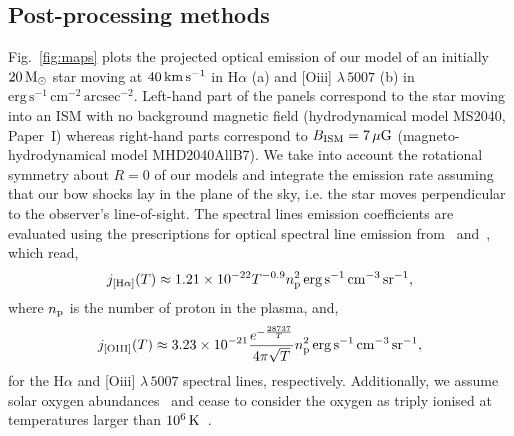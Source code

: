 \documentclass[useAMS,usenatbib]{mn2e}
\begin{document}
\subsection{Post-processing methods}
\label{sect:maps}


Fig.~\ref{fig:maps} plots the projected optical emission of our model of an initially
$20\, \rm M_{\odot}$ star moving at $40\, \rm km\, \rm s^{-1}$ in H$\alpha$ (a)
and [O{\sc iii}] $\lambda \, 5007$ (b) in $\mathrm{erg}\, \mathrm{s}^{-1}\, \mathrm{cm}^{-2}\,
\mathrm{arcsec}^{-2}$. Left-hand part of the panels correspond to the star
moving into an ISM with no background magnetic field (hydrodynamical model MS2040, Paper~I) whereas right-hand
parts correspond to $B_{\rm ISM}=7\, \rm \mu G$ (magneto-hydrodynamical model MHD2040AllB7). We take into
account the rotational symmetry about $R=0$ of our models and integrate the
emission rate assuming that our bow shocks lay in the plane of the sky, i.e. 
the star moves perpendicular to the observer’s line-of-sight. The
spectral lines emission coefficients are evaluated using the 
prescriptions for optical spectral line emission 
from~\citet{dopita_aa_29_1973} and~\citet{osterbrock_1989}, which read,
%
\begin{equation}
	j_{\rm [H\alpha]}(T) \approx 1.21\times 10^{-22} T^{-0.9} n_{\rm p}^{2}\, \rm erg\, s^{-1}\, cm^{-3}\, sr^{-1},
\label{eq:Ha}
\end{equation}
%
where $n_{\rm p}$ is the number of proton in the plasma, and,
%
\begin{equation}
	j_{\rm [O{\sc III}]}(T) \approx 3.23\times 10^{-21} \frac{ e^{-\frac{28737}{T}} }{4\pi\sqrt{T}} n_{\rm p}^{2}\, \rm erg\, s^{-1}\, cm^{-3}\, sr^{-1},
\label{eq:OIII}
\end{equation}
%
for the H$\alpha$ and [O{\sc iii}] $\lambda \, 5007$ spectral lines, respectively. 
Additionally, we assume solar oxygen abundances~\citep{lodders_apj_591_2003} and cease to
consider the oxygen as triply ionised at temperatures larger than $10^{6}\, \rm
K$~\citep[cf.][]{cox_mnras_250_1991}. 
%
\end{document}
